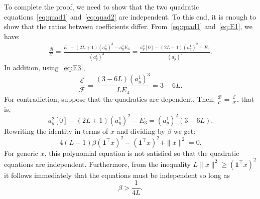 \documentclass[12pt]{article}
\newcommand{\1}{\mathbf{1}}
\theoremstyle{plain}
\theoremstyle{definition}
\theoremstyle{remark}
\theoremstyle{plain}
\theoremstyle{remark}
\theoremstyle{plain}
\theoremstyle{plain}
\theoremstyle{plain}
\numberwithin{equation}{section}
\begin{document}
To complete the proof, we need to show that the two quadratic equations~\eqref{eq:quad1} and~\eqref{eq:quad2} are independent. To this end, it is enough to show that the ratios between coefficients differ. 
From~\eqref{eq:quad1} and~\eqref{eq:E1}, we have:
\begin{equation*}
\begin{split}
\frac{\mathcal{B}}{\mathcal{C}} = \frac{E_1 - (2L+1)(a_y^1)^3 - a_y^1E_3}{(a_y^1)^3} = \frac{a_y^2[0] - (2L+1)(a_y^1)^2 - E_3}{(a_y^1)^2}.
\end{split}
\end{equation*}
In addition, using~\eqref{eq:E3},
\begin{equation*}
\frac{\mathcal{E}}{\mathcal{F}} = \frac{(3-6L)(a_y^1)^3}{LE_4} = 3 - 6L . 
\end{equation*}
For contradiction, suppose that the quadratics are dependent. Then, $\frac{\mathcal{B}}{\mathcal{C}} =\frac{\mathcal{E}}{\mathcal{F}} $, that is, 	
\begin{equation*}
a_y^2[0] - (2L+1)(a_y^1)^2 - E_3 = (a_y^1)^2(3-6L).
\end{equation*}
Rewriting the identity in terms of $x$ and dividing by $\beta$ we get:
\begin{equation} \label{eq:cond}
4(L-1)\beta (\1^\top x)^2  - (\1^\top x)^2 + \|x\|^2 = 0.
\end{equation}	
For generic $x$,  this polynomial equation is not satisfied so that the quadratic equations are independent. 
Furthermore, from the inequality $L\|x\|^2 \ge (\1^\top x)^2$ it follows immediately that the equations must be independent so long as
\begin{equation*}
\beta > \frac{1}{4L}.
\end{equation*}
\end{document}
